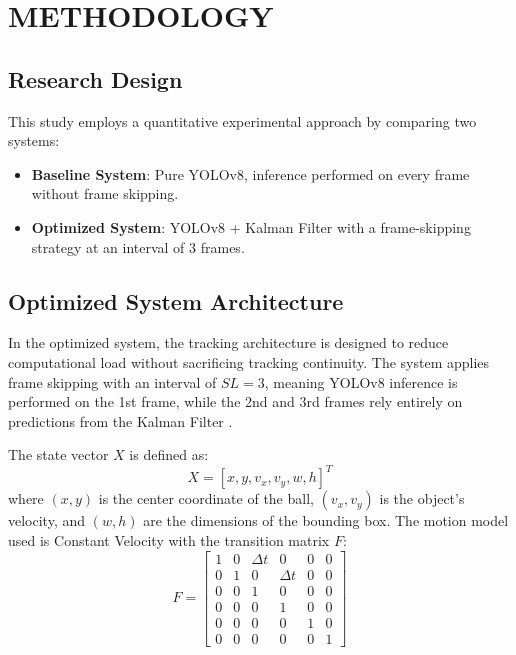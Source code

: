 \documentclass[12pt,a4paper]{article}
\begin{document}
\section{METHODOLOGY}

\subsection{Research Design}
This study employs a quantitative experimental approach by comparing two systems:
\begin{itemize}
    \item \textbf{Baseline System}: Pure YOLOv8, inference performed on every frame without frame skipping.
    \item \textbf{Optimized System}: YOLOv8 + Kalman Filter with a frame-skipping strategy at an interval of 3 frames.
\end{itemize}

\subsection{Optimized System Architecture}
In the optimized system, the tracking architecture is designed to reduce computational load without sacrificing tracking continuity. The system applies frame skipping with an interval of $SL = 3$, meaning YOLOv8 inference is performed on the 1st frame, while the 2nd and 3rd frames rely entirely on predictions from the Kalman Filter \cite{Taylor2016}.

The state vector $X$ is defined as:
\begin{equation}
X = [x, y, v_x, v_y, w, h]^T
\end{equation}
where $(x, y)$ is the center coordinate of the ball, $(v_x, v_y)$ is the object's velocity, and $(w, h)$ are the dimensions of the bounding box. The motion model used is Constant Velocity with the transition matrix $F$:
\begin{equation}
F = \begin{bmatrix}
1 & 0 & \Delta t & 0 & 0 & 0 \\
0 & 1 & 0 & \Delta t & 0 & 0 \\
0 & 0 & 1 & 0 & 0 & 0 \\
0 & 0 & 0 & 1 & 0 & 0 \\
0 & 0 & 0 & 0 & 1 & 0 \\
0 & 0 & 0 & 0 & 0 & 1
\end{bmatrix}
\end{equation}
\end{document}
